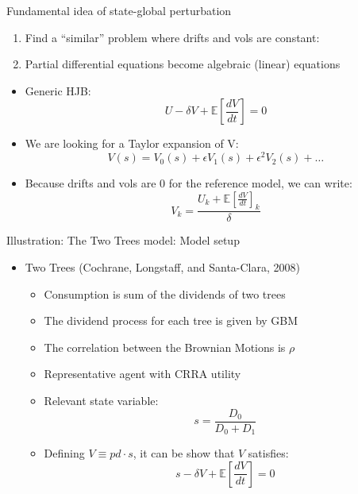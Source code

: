 \documentclass[12pt,aspectratio=169]{beamer}
\newcommand{\vspM}{\vspace{0.12truecm}}
\begin{document}
\begin{frame}{Fundamental idea of state-global perturbation}
    \begin{enumerate}
      \item Find a ``similar'' problem where drifts and vols are constant:
      \item Partial differential equations become algebraic (linear) equations
    \end{enumerate}
    
    \begin{itemize}
      \item Generic HJB:
          $$U - \delta V + \mathbb{E}\left[\frac{dV}{dt}\right] = 0 $$
    
      \item We are looking for a Taylor expansion of V:
        $$
          V(s) = V_0(s) + \epsilon V_1(s) + \epsilon^2 V_2(s) + \ldots
        $$
    
      \item Because drifts and vols are 0 for the reference model, we can write:
          $$
            V_k = \frac{U_k + \mathbb{E}\left[\frac{dV}{dt}\right]_k}{\delta}
          $$
    
    \end{itemize}
\end{frame}


  \begin{frame}{Illustration: The Two Trees model: Model setup}
    \begin{itemize}
      \item Two Trees {\scriptsize (Cochrane, Longstaff, and Santa-Clara, 2008)}
        \begin{itemize}
          \item Consumption is sum of the dividends of two trees\vspM
          \item The dividend process for each tree is given by GBM\vspM
          \item The correlation between the Brownian Motions is $\rho$\vspM
          \item Representative agent with CRRA utility\vspM
          \item Relevant state variable:
          $$ s = \frac{D_0}{D_0 + D_1} $$\vspM
          \item Defining  $V \equiv pd \cdot s$, it can be show that $V$ satisfies:
            $$ s - \delta V + \mathbb{E}\left[\frac{dV}{dt}\right] = 0 $$
        \end{itemize}
    \end{itemize}
  \end{frame}
  
\end{document}
